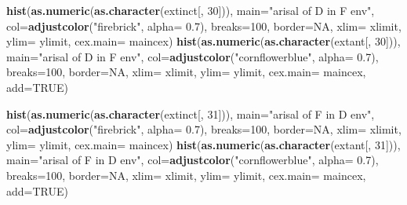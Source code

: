 \documentclass[]{book}
\newenvironment{Shaded}{\begin{snugshade}}{\end{snugshade}}
\newcommand{\KeywordTok}[1]{\textcolor[rgb]{0.13,0.29,0.53}{\textbf{{#1}}}}
\newcommand{\DataTypeTok}[1]{\textcolor[rgb]{0.13,0.29,0.53}{{#1}}}
\newcommand{\DecValTok}[1]{\textcolor[rgb]{0.00,0.00,0.81}{{#1}}}
\newcommand{\FloatTok}[1]{\textcolor[rgb]{0.00,0.00,0.81}{{#1}}}
\newcommand{\StringTok}[1]{\textcolor[rgb]{0.31,0.60,0.02}{{#1}}}
\newcommand{\OtherTok}[1]{\textcolor[rgb]{0.56,0.35,0.01}{{#1}}}
\newcommand{\NormalTok}[1]{{#1}}
\theoremstyle{definition}
\theoremstyle{definition}
\theoremstyle{remark}
\begin{document}
\begin{Shaded}
\begin{Highlighting}[]
\KeywordTok{hist}\NormalTok{(}\KeywordTok{as.numeric}\NormalTok{(}\KeywordTok{as.character}\NormalTok{(extinct[, }\DecValTok{30}\NormalTok{])), }\DataTypeTok{main=}\StringTok{"arisal of D in F env"}\NormalTok{, }\DataTypeTok{col=}\KeywordTok{adjustcolor}\NormalTok{(}\StringTok{"firebrick"}\NormalTok{, }\DataTypeTok{alpha=} \FloatTok{0.7}\NormalTok{), }\DataTypeTok{breaks=}\DecValTok{100}\NormalTok{, }\DataTypeTok{border=}\OtherTok{NA}\NormalTok{, }\DataTypeTok{xlim=}\NormalTok{ xlimit, }\DataTypeTok{ylim=}\NormalTok{ ylimit, }\DataTypeTok{cex.main=}\NormalTok{ maincex)}
\KeywordTok{hist}\NormalTok{(}\KeywordTok{as.numeric}\NormalTok{(}\KeywordTok{as.character}\NormalTok{(extant[, }\DecValTok{30}\NormalTok{])), }\DataTypeTok{main=}\StringTok{"arisal of D in F env"}\NormalTok{, }\DataTypeTok{col=}\KeywordTok{adjustcolor}\NormalTok{(}\StringTok{"cornflowerblue"}\NormalTok{, }\DataTypeTok{alpha=} \FloatTok{0.7}\NormalTok{), }\DataTypeTok{breaks=}\DecValTok{100}\NormalTok{, }\DataTypeTok{border=}\OtherTok{NA}\NormalTok{, }\DataTypeTok{xlim=}\NormalTok{ xlimit, }\DataTypeTok{ylim=}\NormalTok{ ylimit, }\DataTypeTok{cex.main=}\NormalTok{ maincex, }\DataTypeTok{add=}\OtherTok{TRUE}\NormalTok{)}

\KeywordTok{hist}\NormalTok{(}\KeywordTok{as.numeric}\NormalTok{(}\KeywordTok{as.character}\NormalTok{(extinct[, }\DecValTok{31}\NormalTok{])), }\DataTypeTok{main=}\StringTok{"arisal of F in D env"}\NormalTok{, }\DataTypeTok{col=}\KeywordTok{adjustcolor}\NormalTok{(}\StringTok{"firebrick"}\NormalTok{, }\DataTypeTok{alpha=} \FloatTok{0.7}\NormalTok{), }\DataTypeTok{breaks=}\DecValTok{100}\NormalTok{, }\DataTypeTok{border=}\OtherTok{NA}\NormalTok{, }\DataTypeTok{xlim=}\NormalTok{ xlimit, }\DataTypeTok{ylim=}\NormalTok{ ylimit, }\DataTypeTok{cex.main=}\NormalTok{ maincex)}
\KeywordTok{hist}\NormalTok{(}\KeywordTok{as.numeric}\NormalTok{(}\KeywordTok{as.character}\NormalTok{(extant[, }\DecValTok{31}\NormalTok{])), }\DataTypeTok{main=}\StringTok{"arisal of F in D env"}\NormalTok{, }\DataTypeTok{col=}\KeywordTok{adjustcolor}\NormalTok{(}\StringTok{"cornflowerblue"}\NormalTok{, }\DataTypeTok{alpha=} \FloatTok{0.7}\NormalTok{), }\DataTypeTok{breaks=}\DecValTok{100}\NormalTok{, }\DataTypeTok{border=}\OtherTok{NA}\NormalTok{, }\DataTypeTok{xlim=}\NormalTok{ xlimit, }\DataTypeTok{ylim=}\NormalTok{ ylimit, }\DataTypeTok{cex.main=}\NormalTok{ maincex, }\DataTypeTok{add=}\OtherTok{TRUE}\NormalTok{)}


\end{Highlighting}
\end{Shaded}
\end{document}
